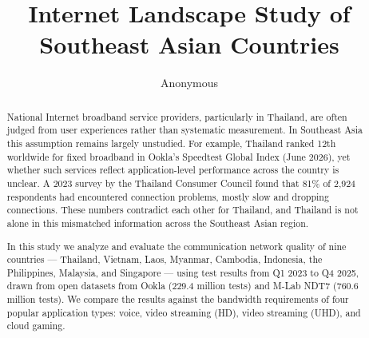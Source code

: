 \documentclass[sigconf,anonymous,review]{acmart}
\begin{document}
\title{Internet Landscape Study of Southeast Asian Countries}

\author{Anonymous}

\renewcommand{\shortauthors}{Anonymous}

\begin{abstract}
National Internet broadband service providers, particularly in Thailand, are
often judged from user experiences rather than systematic measurement. In
Southeast Asia this assumption remains largely unstudied. For example,
Thailand ranked 12th worldwide for fixed broadband in Ookla's Speedtest
Global Index (June 2026), yet whether such services reflect
application-level performance across the country is unclear. A 2023 survey
by the Thailand Consumer Council found that 81\% of 2,924 respondents had
encountered connection problems, mostly slow and dropping connections. These
numbers contradict each other for Thailand, and Thailand is not alone in
this mismatched information across the Southeast Asian region.

In this study we analyze and evaluate the communication network quality of
nine countries --- Thailand, Vietnam, Laos, Myanmar, Cambodia, Indonesia,
the Philippines, Malaysia, and Singapore --- using test results from Q1 2023
to Q4 2025, drawn from open datasets from Ookla (229.4 million tests) and
M-Lab NDT7 (760.6 million tests). We compare the results against the
bandwidth requirements of four popular application types: voice, video
streaming (HD), video streaming (UHD), and cloud gaming.
\end{abstract}


\maketitle
\end{document}
